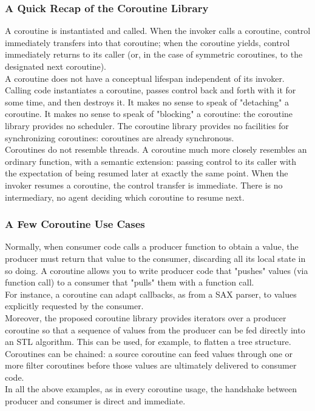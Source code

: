 \subsubsection*{A Quick Recap of the Coroutine Library}
A coroutine is instantiated and called. When the invoker calls a coroutine,
control immediately transfers into that coroutine; when the coroutine yields,
control immediately returns to its caller (or, in the case of symmetric
coroutines, to the designated next coroutine).\\
\newline
A coroutine does not have a conceptual lifespan independent of its invoker.
Calling code instantiates a coroutine, passes control back and forth with it
for some time, and then destroys it. It makes no sense to speak of "detaching"
a coroutine. It makes no sense to speak of "blocking" a coroutine: the
coroutine library provides no scheduler. The coroutine library provides no
facilities for synchronizing coroutines: coroutines are already synchronous.\\
\newline
Coroutines do not resemble threads. A coroutine much more closely resembles an
ordinary function, with a semantic extension: passing control to its caller
with the expectation of being resumed later at exactly the same point. When
the invoker resumes a coroutine, the control transfer is immediate. There is
no intermediary, no agent deciding which coroutine to resume next.\\

\subsubsection*{A Few Coroutine Use Cases}
Normally, when consumer code calls a producer function to obtain a value, the
producer must return that value to the consumer, discarding all its local
state in so doing. A coroutine allows you to write producer code that "pushes"
values (via function call) to a consumer that "pulls" them with a function
call.\\
\newline
For instance, a coroutine can adapt callbacks, as from a SAX parser, to values
explicitly requested by the consumer.\\
\newline
Moreover, the proposed coroutine library provides iterators over a producer
coroutine so that a sequence of values from the producer can be fed directly
into an STL algorithm. This can be used, for example, to flatten a tree
structure.\\
\newline
Coroutines can be chained: a source coroutine can feed values through one or
more filter coroutines before those values are ultimately delivered to
consumer code.\\
\newline
In all the above examples, as in every coroutine usage, the handshake between
producer and consumer is direct and immediate.
